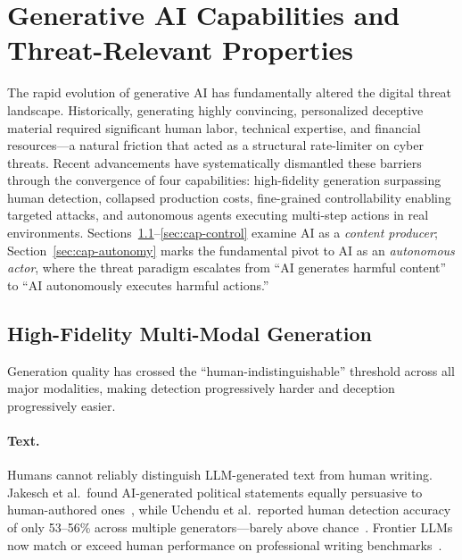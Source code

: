 
\section{Generative AI Capabilities and Threat-Relevant Properties}
\label{sec:capabilities}

The rapid evolution of generative AI has fundamentally altered the digital threat landscape. Historically, generating highly convincing, personalized deceptive material required significant human labor, technical expertise, and financial resources---a natural friction that acted as a structural rate-limiter on cyber threats. Recent advancements have systematically dismantled these barriers through the convergence of four capabilities: high-fidelity generation surpassing human detection, collapsed production costs, fine-grained controllability enabling targeted attacks, and autonomous agents executing multi-step actions in real environments. Sections~\ref{sec:cap-fidelity}--\ref{sec:cap-control} examine AI as a \emph{content producer}; Section~\ref{sec:cap-autonomy} marks the fundamental pivot to AI as an \emph{autonomous actor}, where the threat paradigm escalates from ``AI generates harmful content'' to ``AI autonomously executes harmful actions.''


\subsection{High-Fidelity Multi-Modal Generation}
\label{sec:cap-fidelity}

Generation quality has crossed the ``human-indistinguishable'' threshold across all major modalities, making detection progressively harder and deception progressively easier.

\paragraph{Text.}
Humans cannot reliably distinguish LLM-generated text from human writing. Jakesch et al.\ found AI-generated political statements equally persuasive to human-authored ones~\cite{jakesch2023human}, while Uchendu et al.\ reported human detection accuracy of only 53--56\% across multiple generators---barely above chance~\cite{uchendu2023human}. Frontier LLMs now match or exceed human performance on professional writing benchmarks~\cite{gpt4,gemini2024,deepseekv3}.

